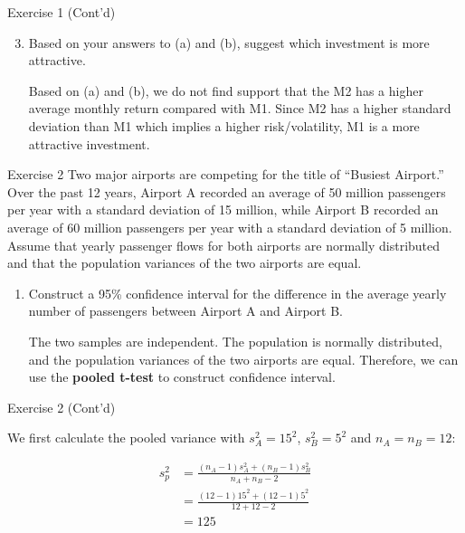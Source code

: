 \documentclass[
  ignorenonframetext,
  aspectratio=43,
]{beamer}
\let\olditem\item
\renewcommand\item{\olditem\justifying}
\begin{document}
\begin{frame}{Exercise 1 (Cont'd)}
\protect\hypertarget{exercise-1-contd-7}{}
\begin{enumerate}
\setcounter{enumi}{2}
\item
  Based on your answers to (a) and (b), suggest which investment is more
  attractive.

  \pause

  Based on (a) and (b), we do not find support that the M2 has a higher
  average monthly return compared with M1. Since M2 has a higher
  standard deviation than M1 which implies a higher risk/volatility, M1
  is a more attractive investment.
\end{enumerate}
\end{frame}

\begin{frame}{Exercise 2}
\protect\hypertarget{exercise-2}{}
Two major airports are competing for the title of ``Busiest Airport.''
Over the past 12 years, Airport A recorded an average of 50 million
passengers per year with a standard deviation of 15 million, while
Airport B recorded an average of 60 million passengers per year with a
standard deviation of 5 million. Assume that yearly passenger flows for
both airports are normally distributed and that the population variances
of the two airports are equal.

\begin{enumerate}
\item
  Construct a 95\% confidence interval for the difference in the average
  yearly number of passengers between Airport A and Airport B.

  \pause

  The two samples are independent. The population is normally
  distributed, and the population variances of the two airports are
  equal. Therefore, we can use the \textbf{pooled t-test} to construct
  confidence interval.
\end{enumerate}
\end{frame}

\begin{frame}{Exercise 2 (Cont'd)}
\protect\hypertarget{exercise-2-contd}{}
\pause

We first calculate the pooled variance with \(s_{A}^2 = 15^2\),
\(s_{B}^2 = 5^2\) and \(n_{A} = n_{B} = 12\):

\pause

\[
\begin{aligned}
s_p^2 &= \frac{(n_A-1) s_A^2 + (n_B-1) s_B^2}{n_A+n_B-2} \\
      &= \frac{(12-1) 15^2 + (12-1) 5^2}{12+12-2} \\
      &= 125
\end{aligned}
\]
\end{frame}
\end{document}
